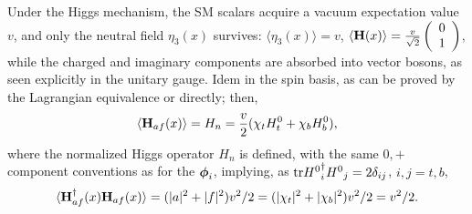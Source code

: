 \documentclass[12pt]{article}
\renewcommand\[{\begin{dmath}}
\renewcommand\]{\end{dmath}}
\newcommand{\boldmathphi}{\mbox{\boldmath$\phi$\unboldmath}}
\begin{document}
 Under the Higgs mechanism,   the  SM
scalars acquire\cite{HiggsMech,HiggsMechHiggs}       a  vacuum expectation value $v$, and only the neutral field $\eta_3(x)$ survives:  $\langle \eta_3(x)\rangle=v$,
 $\langle {\bf H}(x)\rangle=  \frac{v}{\sqrt{2}} \left(\begin{array}{c}
 0\\
  1
\end{array}\right)$,
 while the charged and imaginary components are absorbed into vector bosons,
as seen explicitly in the unitary gauge.  Idem in the spin basis, as can be  proved by the Lagrangian equivalence or directly; then,
 \begin{eqnarray}
\label  {HiggsComponentsYm1}
  \langle{\bf H}_{af}(x)\rangle= H_n= \frac{v} {2} (\chi_t  H_t^0+\chi_b  H_b^0  ),
 \end{eqnarray}
 where the normalized Higgs operator $H_n$ is defined,   with the same  $0,+$   component  conventions as  for  the ${ \boldmathphi}_i $,
  implying,  as  ${\rm tr}{ H^0}_{i}^\dagger{ H^0}_{j}=2 \delta_{ij}$, $i,j=t,b$,
 \begin{eqnarray}
\label  {HiggsNormVacuumExpRR}
  \langle {\bf H}_{af}^\dagger(x){\bf H}_{af}(x) \rangle =(|a|^2+|f|^2)v^2/2   =(|\chi_t|^2+|\chi_b|^2)v^2/2=v^2/2.
  \end{eqnarray}

\end{document}
